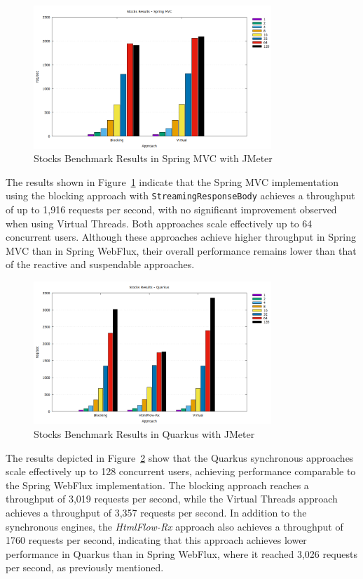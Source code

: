\begin{figure}[h]
     \centering
     \includegraphics[width=0.8\textwidth]{./Graphs/stocks-springmvc-jmeter.png}
     \caption{Stocks Benchmark Results in Spring MVC with JMeter}\label{fig:stocks-springmvc-jmeter}
\end{figure}

The results shown in Figure~\ref{fig:stocks-springmvc-jmeter} indicate that the
Spring MVC implementation using the blocking approach with
\texttt{StreamingResponseBody} achieves a throughput of up to 1,916 requests
per second, with no significant improvement observed when using Virtual
Threads. Both approaches scale effectively up to 64 concurrent users. Although
these approaches achieve higher throughput in Spring MVC than in Spring
WebFlux, their overall performance remains lower than that of the reactive and
suspendable approaches.

\begin{figure}[h]
     \centering
     \includegraphics[width=0.8\textwidth]{./Graphs/stocks-quarkus-jmeter.png}
     \caption{Stocks Benchmark Results in Quarkus with JMeter}\label{fig:stocks-quarkus-jmeter}
\end{figure}

The results depicted in Figure~\ref{fig:stocks-quarkus-jmeter} show that the
Quarkus synchronous approaches scale effectively up to 128 concurrent users,
achieving performance comparable to the Spring WebFlux implementation. The
blocking approach reaches a throughput of 3,019 requests per second, while the
Virtual Threads approach achieves a throughput of 3,357 requests per second. In
addition to the synchronous engines, the \textit{HtmlFlow-Rx} approach also
achieves a throughput of 1760 requests per second, indicating that this
approach achieves lower performance in Quarkus than in Spring WebFlux, where it
reached 3,026 requests per second, as previously mentioned.

